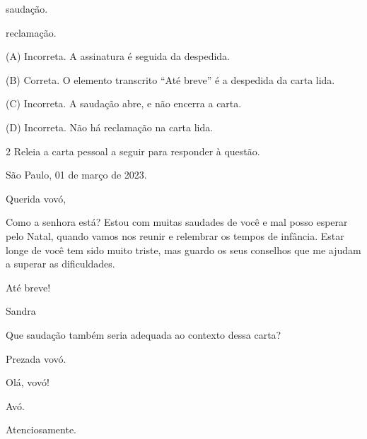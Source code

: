 \begin{escolha}
\begin{escolha}
\item saudação.

\item reclamação.
\end{escolha}


(A) Incorreta. A assinatura é seguida da despedida.

(B) Correta. O elemento transcrito ``Até breve'' é a despedida da carta
lida.

(C) Incorreta. A saudação abre, e não encerra a carta.

(D) Incorreta. Não há reclamação na carta lida.

\num{2} Releia a carta pessoal a seguir para responder à questão.


\begin{mdframed}[linewidth=10pt,linecolor=salmao!20,backgroundcolor=salmao!20,roundcorner=20pt]
São Paulo, 01 de março de 2023.

Querida vovó,

Como a senhora está? Estou com muitas saudades de você e mal posso
esperar pelo Natal, quando vamos nos reunir e relembrar os tempos de
infância. Estar longe de você tem sido muito triste, mas guardo os seus
conselhos que me ajudam a superar as dificuldades.

\begin{flushright}
Até breve!

Sandra
\end{flushright}
\end{mdframed}

Que saudação também seria adequada ao contexto dessa carta?

\begin{escolha}
\item Prezada vovó.

\item Olá, vovó!

\item Avó.

\item Atenciosamente.
\end{escolha}


\end{escolha}
